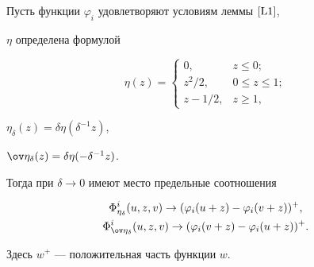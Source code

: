 \begin{lem} \label{L2}


Пусть функции $\varphi_{i}$ удовлетворяют условиям леммы $\ref{L1}$,


$ \eta$ определена формулой 


$$


\eta (z)=


\begin{cases}


0, & z \leq 0; \\


z^{2} / 2, & 0 \leq z \leq 1; \\


z -1 / 2, & z \geq 1,


\end{cases}


$$


$\eta_{\delta}(z)= \delta \eta (\delta^{-1}z)$, 


$\ov \eta_{\delta}(z)= \delta \eta (- \delta^{-1}z)$.


Тогда при $\delta\rightarrow 0$ имеют место предельные соотношения


\begin{gather} \label{eq13} 


\Phi_{\eta_{\delta}}^{i}(u,z,v) \rightarrow (\varphi_{i}(u+z) 


-\varphi_{i}(v+z))^{+}, \\




\label{eq13.1} 


\Phi_{\ov \eta_{\delta}}^{i}(u,z,v) \rightarrow (\varphi_{i}(v+z) 


-\varphi_{i}(u+z))^{+}.


\end{gather}


Здесь $w^{+}$ --- положительная часть функции $w$. 


\end{lem}





